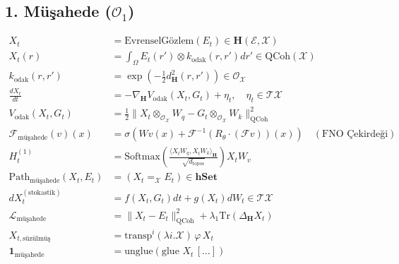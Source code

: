 \documentclass[11pt, a4paper]{article}
\begin{document}
\subsection{1. Müşahede ($\mathcal{O}_1$)}
\begin{align}
X_t &= \text{EvrenselGözlem}(E_t) \in \mathbf{H}(\mathcal{E}, \mathcal{X}) \\
X_t(r) &= \int_{\Omega} E_t(r') \otimes k_{\text{odak}}(r, r') dr' \in \text{QCoh}(\mathcal{X}) \\
k_{\text{odak}}(r, r') &= \exp\left( -\frac{1}{2} d_{\mathbf{H}}^2(r, r') \right) \in \mathcal{O}_{\mathcal{X}} \\
\frac{d X_t}{dt} &= -\nabla_{\mathbf{H}} V_{\text{odak}}(X_t, G_t) + \eta_t, \quad \eta_t \in \mathcal{T}\mathcal{X} \\
V_{\text{odak}}(X_t, G_t) &= \frac{1}{2} \|X_t \otimes_{\mathcal{O}_{\mathcal{X}}} W_q - G_t \otimes_{\mathcal{O}_{\mathcal{X}}} W_k\|_{\text{QCoh}}^2 \\
\mathcal{F}_{\text{müşahede}}(v)(x) &= \sigma\left( W v(x) + \mathcal{F}^{-1}\left( R_\theta \cdot (\mathcal{F} v) \right)(x) \right) \quad (\text{FNO Çekirdeği}) \\
H_t^{(1)} &= \text{Softmax}\left( \frac{\langle X_t W_q, X_t W_k \rangle_{\mathbf{H}}}{\sqrt{d_{\text{topos}}}} \right) X_t W_v \\
\text{Path}_{\text{müşahede}}(X_t, E_t) &= (X_t =_{\mathcal{X}} E_t) \in \mathbf{hSet} \\
d X_t^{(\text{stokastik})} &= f(X_t, G_t) dt + g(X_t) dW_t \in \mathcal{T}\mathcal{X} \\
\mathcal{L}_{\text{müşahede}} &= \| X_t - E_t \|_{\text{QCoh}}^2 + \lambda_1 \text{Tr}(\Delta_{\mathbf{H}} X_t) \\
X_{t, \text{süzülmüş}} &= \text{transp}^i (\lambda i. \mathcal{X}) \, \varphi \, X_t \\
\mathbf{1}_{\text{müşahede}} &= \text{unglue}(\text{glue } X_t \, [\dots])
\end{align}
\end{document}

